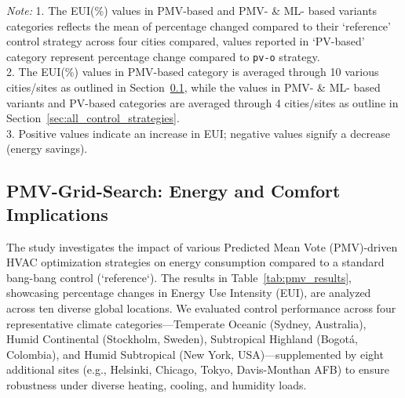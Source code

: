 \begin{table}[htbp]
\begin{tabularx}{\textwidth}{llXr}
\bottomrule
\end{tabularx}
\vspace{1.0em} %
\begin{minipage}{\linewidth}
\footnotesize\raggedright
\textit{Note:} 1. The EUI(\%) values in PMV-based and PMV- \& ML- based variants categories reflects the mean of percentage changed compared to their `reference' control strategy across four cities compared, values reported in `PV-based' category represent percentage change compared to \texttt{pv-o} strategy.\\
2. The EUI(\%) values in PMV-based category is averaged through 10 various cities/sites as outlined in Section~\ref{sec:pmv_results}, while the values in PMV- \& ML- based variants and PV-based categories are averaged through 4 cities/sites as outline in Section~\ref{sec:all_control_strategies}. \\
3. Positive values indicate an increase in EUI; negative values signify a decrease (energy savings).
\end{minipage}
\end{table}

\subsection{PMV-Grid-Search: Energy and Comfort Implications}
\label{sec:pmv_results}
The study investigates the impact of various Predicted Mean Vote (PMV)-driven HVAC optimization strategies on energy consumption compared to a standard bang-bang control (`reference`). The results in Table~\ref{tab:pmv_results}, showcasing percentage changes in Energy Use Intensity (EUI), are analyzed across ten diverse global locations. We evaluated control performance across four representative climate categories—Temperate Oceanic (Sydney, Australia), Humid Continental (Stockholm, Sweden), Subtropical Highland (Bogotá, Colombia), and Humid Subtropical (New York, USA)—supplemented by eight additional sites (e.g., Helsinki, Chicago, Tokyo, Davis-Monthan AFB) to ensure robustness under diverse heating, cooling, and humidity loads.  

